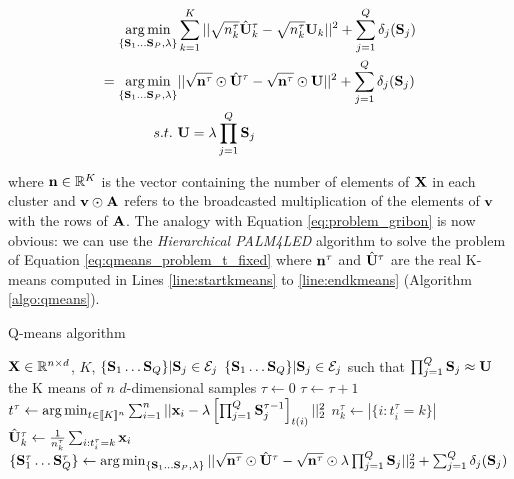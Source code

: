 \documentclass{article}
\begin{document}
\begin{equation}
\label{eq:qmeans_problem_t_fixed}
\begin{split}
 \operatorname*{arg\,min}_{\{{\mathbf{S}}_1 \dots {\mathbf{S}}_P, \lambda\}} & \sum_{k=1}^{K} ||\sqrt{n_k^\tau}\hat{{\mathbf{U}}}^{\tau}_k - \sqrt{n_k^\tau}{\mathbf{U}}_k||^2 + \sum_{j=1}^{Q} \delta_j({\mathbf{S}}_j)\\
 =\operatorname*{arg\,min}_{\{{\mathbf{S}}_1 \dots {\mathbf{S}}_P, \lambda\}} & ||\sqrt{{\mathbf{n}}^\tau} \odot \hat{{\mathbf{U}}}^{\tau} - \sqrt{{\mathbf{n}}^\tau} \odot {\mathbf{U}}||^2 + \sum_{j=1}^{Q} \delta_j({\mathbf{S}}_j)\\
 s.t. ~& {\mathbf{U}} = \lambda \prod_{j=1}^{Q}{{\mathbf{S}}_j} \\
\end{split}
\end{equation}

where ${\mathbf{n}} \in \mathbb{R}^K$ is the vector containing the number of elements of ${\mathbf{X}}$ in each cluster and ${\mathbf{v}} \odot {\mathbf{A}}$ refers to the broadcasted multiplication of the elements of ${\mathbf{v}}$ with the rows of ${\mathbf{A}}$. The analogy with Equation \ref{eq:problem_gribon} is now obvious: we can use the \textit{Hierarchical PALM4LED} algorithm \cite{magoarou2014learning} to solve the problem of Equation \ref{eq:qmeans_problem_t_fixed} where ${\mathbf{n}}^\tau$ and $\hat{{\mathbf{U}}}^{\tau}$ are the real K-means computed in Lines \ref{line:startkmeans} to \ref{line:endkmeans} (Algorithm \ref{algo:qmeans}).

\begin{algorithm}
\caption{Q-means algorithm}
\label{algo:qmeans}
\begin{algorithmic}[1]


\REQUIRE ${\mathbf{X}} \in \mathbb{R}^{n \times d}$, $K$, $\{{\mathbf{S}}_1 \dots {\mathbf{S}}_{Q}\}|{\mathbf{S}}_j \in \mathcal{E}_j$
\ENSURE $\{{\mathbf{S}}_1 \dots {\mathbf{S}}_{Q}\}|{\mathbf{S}}_j \in \mathcal{E}_j$ such that $\prod_{j=1}^{Q}{\mathbf{S}}_j \approx {\mathbf{U}}$ the K means of $n$ $d$-dimensional samples
\STATE $\tau \leftarrow 0$
\REPEAT
\STATE $\tau \leftarrow \tau + 1$
\STATE $t^\tau \leftarrow \operatorname*{arg\,min}_{t \in [\![K]\!]^n} \sum_{i=1}^{n} {||{\mathbf{x}}_i - \lambda \left[\prod_{j=1}^{Q}{{\mathbf{S}}_j^{\tau -1}}\right]_{t(i)}||_2^2}$
\label{line:startkmeans}
\STATE $n_k^\tau \leftarrow |\{i: t^\tau_i=k\}|$
\STATE $\hat{{\mathbf{U}}}^\tau_k \leftarrow \frac{1}{n^\tau_k} \sum_{i: t^\tau_i = k} {{\mathbf{x}}_i}$
\ENDFOR
\label{line:endkmeans}
\STATE $\{{\mathbf{S}}^\tau_1 \dots {\mathbf{S}}^\tau_{Q}\} \leftarrow \operatorname*{arg\,min}_{\{{\mathbf{S}}_1 \dots {\mathbf{S}}_P, \lambda\}} ||\sqrt{{\mathbf{n}}^\tau} \odot \hat{{\mathbf{U}}}^\tau - \sqrt{{\mathbf{n}}^\tau} \odot \lambda \prod_{j=1}^{Q}{{\mathbf{S}}_j}||_2^2 + \sum_{j=1}^{Q} \delta_j({\mathbf{S}}_j)$
\end{algorithmic}
\end{algorithm}
\end{document}
